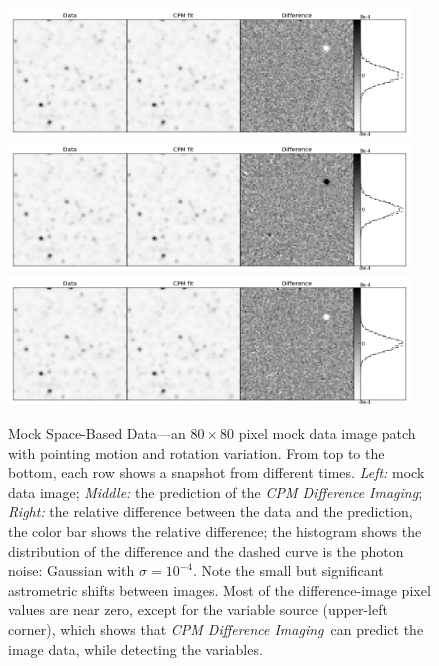 \documentclass[12pt, preprint]{aastex}
\newcommand{\project}[1]{\textsl{#1}}
\newcommand{\cpmdiff}{\project{CPM Difference Imaging}}
\begin{document}
\begin{figure}[p]
\begin{center}
\includegraphics[width=0.95\textwidth]{f1a}
\includegraphics[width=0.95\textwidth]{f1b}
\includegraphics[width=0.95\textwidth]{f1c}
\end{center}
\caption{
\label{space}
  Mock Space-Based Data---an $80\times 80$ pixel mock data image patch with pointing motion and rotation variation. 
  From top to the bottom,  each row shows a snapshot from different times.
  \emph{Left:} mock data image;
  \emph{Middle:} the prediction of the \cpmdiff;
  \emph{Right:} the relative difference between the data and the prediction, the color bar shows the relative difference;
  the histogram shows the distribution of the difference and the dashed curve is the photon noise: Gaussian with $\sigma = 10^{-4}$.
  Note the small but significant astrometric shifts between images.
  Most of the difference-image pixel values are near zero, except for the variable source (upper-left corner), which shows that \cpmdiff\ can predict the image data, while detecting the variables. 
}
\end{figure}
\end{document}
